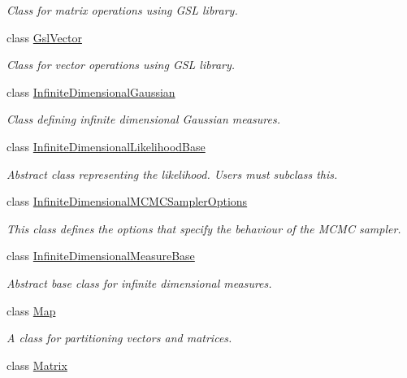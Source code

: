 \begin{DoxyCompactItemize}
\begin{DoxyCompactList}\small\item\em Class for matrix operations using G\-S\-L library. \end{DoxyCompactList}\item 
class \hyperlink{class_q_u_e_s_o_1_1_gsl_vector}{Gsl\-Vector}
\begin{DoxyCompactList}\small\item\em Class for vector operations using G\-S\-L library. \end{DoxyCompactList}\item 
class \hyperlink{class_q_u_e_s_o_1_1_infinite_dimensional_gaussian}{Infinite\-Dimensional\-Gaussian}
\begin{DoxyCompactList}\small\item\em Class defining infinite dimensional Gaussian measures. \end{DoxyCompactList}\item 
class \hyperlink{class_q_u_e_s_o_1_1_infinite_dimensional_likelihood_base}{Infinite\-Dimensional\-Likelihood\-Base}
\begin{DoxyCompactList}\small\item\em Abstract class representing the likelihood. Users must subclass this. \end{DoxyCompactList}\item 
class \hyperlink{class_q_u_e_s_o_1_1_infinite_dimensional_m_c_m_c_sampler_options}{Infinite\-Dimensional\-M\-C\-M\-C\-Sampler\-Options}
\begin{DoxyCompactList}\small\item\em This class defines the options that specify the behaviour of the M\-C\-M\-C sampler. \end{DoxyCompactList}\item 
class \hyperlink{class_q_u_e_s_o_1_1_infinite_dimensional_measure_base}{Infinite\-Dimensional\-Measure\-Base}
\begin{DoxyCompactList}\small\item\em Abstract base class for infinite dimensional measures. \end{DoxyCompactList}\item 
class \hyperlink{class_q_u_e_s_o_1_1_map}{Map}
\begin{DoxyCompactList}\small\item\em A class for partitioning vectors and matrices. \end{DoxyCompactList}\item 
class \hyperlink{class_q_u_e_s_o_1_1_matrix}{Matrix}

\end{DoxyCompactItemize}
